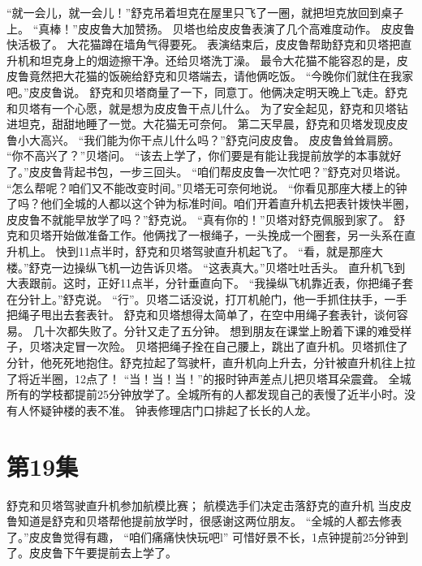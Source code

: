\documentclass[a4paper,12pt,UTF8,twoside]{ctexbook}
\begin{document}
        “就一会儿，就一会儿！”舒克吊着坦克在屋里只飞了一圈，就把坦克放回到桌子上。 
        “真棒！”皮皮鲁大加赞扬。 
        贝塔也给皮皮鲁表演了几个高难度动作。 
        皮皮鲁快活极了。 
        大花猫蹲在墙角气得要死。 
        表演结束后，皮皮鲁帮助舒克和贝塔把直升机和坦克身上的烟迹擦干净。还给贝塔洗丁澡。 
        最令大花猫不能容忍的是，皮皮鲁竟然把大花猫的饭碗给舒克和贝塔端去，请他俩吃饭。 
        “今晚你们就住在我家吧。”皮皮鲁说。 
        舒克和贝塔商量了一下，同意丁。他俩决定明天晚上飞走。舒克和贝塔有一个心愿，就是想为皮皮鲁干点儿什么。 
        为了安全起见，舒克和贝塔钻进坦克，甜甜地睡了一觉。大花猫无可奈何。 
        第二天早晨，舒克和贝塔发现皮皮鲁小大高兴。 
        “我们能为你干点儿什么吗？”舒克问皮皮鲁。 
        皮皮鲁耸耸肩膀。 
        “你不高兴了？”贝塔问。 
        “该去上学了，你们要是有能让我提前放学的本事就好了。”皮皮鲁背起书包，一步三回头。 
        “咱们帮皮皮鲁一次忙吧？”舒克对贝塔说。 
        “怎么帮呢？咱们又不能改变时间。”贝塔无可奈何地说。 
        “你看见那座大楼上的钟了吗？他们全城的人都以这个钟为标准时间。咱们开着直升机去把表针拨快半圈，皮皮鲁不就能早放学了吗？”舒克说。 
        “真有你的！”贝塔对舒克佩服到家了。 
        舒克和贝塔开始做准备工作。他俩找了一根绳子，一头挽成一个圈套，另一头系在直升机上。 
        快到11点半时，舒克和贝塔驾驶直升机起飞了。 
        “看，就是那座大楼。”舒克一边操纵飞机一边告诉贝塔。 
        “这表真大。”贝塔吐吐舌头。 
        直升机飞到大表跟前。这时，正好11点半，分针垂直向下。 
        “我操纵飞机靠近表，你把绳子套在分针上。”舒克说。 
        “行”。贝塔二话没说，打丌机舱门，他一手抓住扶手，一手把绳子甩出去套表针。 
        舒克和贝塔想得太简单了，在空中用绳子套表针，谈何容易。 
        几十次都失败了。分针又走了五分钟。 
        想到朋友在课堂上盼着下课的难受样子，贝塔决定冒一次险。 
        贝塔把绳子拴在自己腰上，跳出了直升机。贝塔抓住了分针，他死死地抱住。舒克拉起了驾驶杆，直升机向上升去，分针被直升机往上拉了将近半圈，12点了！ 
        “当！当！当！”的报时钟声差点儿把贝塔耳朵震聋。 
        全城所有的学枝都提前25分钟放学了。全城所有的人都发现自己的表慢了近半小时。没有人怀疑钟楼的表不准。 
        钟表修理店门口排起了长长的人龙。   \chapter{第19集}   
        舒克和贝塔驾驶直升机参加航模比赛； 
        航模选手们决定击落舒克的直升机   
        当皮皮鲁知道是舒克和贝塔帮他提前放学时，很感谢这两位朋友。 
        “全城的人都去修表了。”皮皮鲁觉得有趣， 
        “咱们痛痛快快玩吧l” 
        可惜好景不长，1点钟提前25分钟到了。皮皮鲁下午要提前去上学了。 
\end{document}
